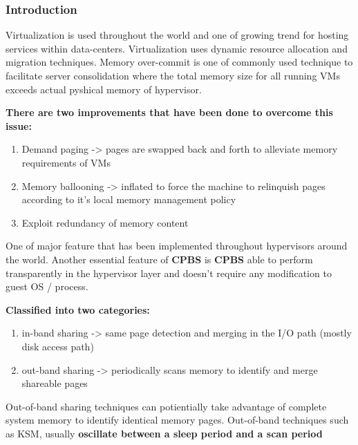 \subsubsection{Introduction}


Virtualization is used throughout the world and one of growing trend for hosting services within data-centers. \cite{rachamalla_mishra_kulkarni_2013}
Virtualization uses dynamic resource allocation and migration techniques. Memory over-commit is one of commonly used technique to facilitate server consolidation where the total memory size for all running VMs exceeds actual pyshical memory of hypervisor.

\textbf{There are two improvements that have been done to overcome this issue:}
\begin{enumerate}
\item Demand paging -> pages are swapped back and forth to alleviate memory requirements of VMs
\item Memory ballooning -> inflated to force the machine to relinquish pages according to it's local memory management policy
\item Exploit redundancy of memory content
\end{enumerate}


One of major feature that has been implemented throughout hypervisors around the world.
Another essential feature of \textbf{CPBS} is \textbf{CPBS} able to perform transparently in the hypervisor layer and doesn't require any modification to guest OS / process.

\textbf{Classified into two categories:}
\begin{enumerate}
\item in-band sharing -> same page detection and merging in the I/O path (mostly disk access path)
\item out-band sharing -> periodically scans memory to identify and merge shareable pages
\end{enumerate}

Out-of-band sharing techniques can potientially take advantage of complete system memory to identify identical memory pages. Out-of-band techniques such as KSM, usually \textbf{oscillate between a sleep period and a scan period}